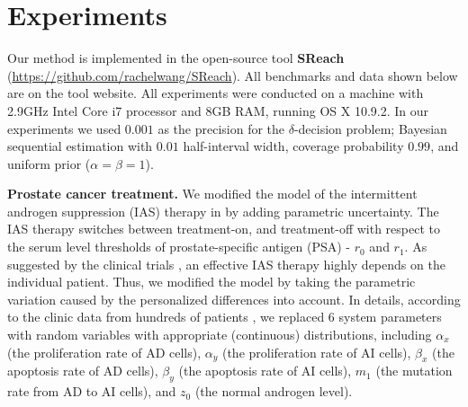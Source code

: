 \section{Experiments}
Our method is implemented in the open-source tool {\bf SReach} (\url{https://github.com/rachelwang/SReach}). All benchmarks and data shown below are on the tool website. All experiments were conducted on a machine with 2.9GHz Intel Core i7 processor and 8GB RAM, running OS X 10.9.2. 
In our experiments we used $0.001$ as the precision for the $\delta$-decision problem; Bayesian sequential estimation
with $0.01$ half-interval width, coverage probability $0.99$, and uniform prior ($\alpha = \beta = 1$). 


{\bf Prostate cancer treatment.}
We modified the model of the intermittent androgen suppression (IAS) therapy in \cite{tanaka2010mathematical} by adding parametric uncertainty. The IAS therapy switches between  treatment-on, and treatment-off with respect to the serum level thresholds of prostate-specific antigen (PSA) - $r_0$ and $r_1$. As suggested by the clinical trials \cite{bruchovsky2006final}, an effective IAS therapy highly depends on the individual patient. Thus, we modified the model by taking the parametric variation caused by the personalized differences into account. In details, according to the clinic data from hundreds of patients \cite{bruchovsky2007locally}, we replaced 6 system 
parameters with random variables with appropriate (continuous) distributions, including $\alpha_x$ (the proliferation rate of AD cells), $\alpha_y$ (the proliferation rate of AI cells), $\beta_x$ (the apoptosis rate of AD cells), $\beta_y$ (the apoptosis rate of AI cells), $m_1$ (the mutation rate from AD to AI cells), and $z_0$ (the normal androgen level).


